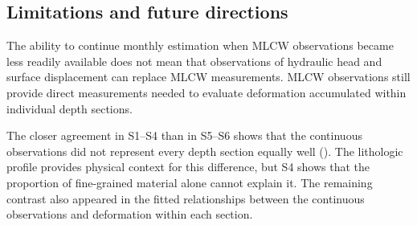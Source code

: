 \subsection{Limitations and future directions}
\label{subsec:discussion_limitations}

The ability to continue monthly estimation when MLCW observations became less readily available does not mean that observations of hydraulic head and surface displacement can replace MLCW measurements. MLCW observations still provide direct measurements needed to evaluate deformation accumulated within individual depth sections.

The closer agreement in S1--S4 than in S5--S6 shows that the continuous observations did not represent every depth section equally well (). The lithologic profile provides physical context for this difference, but S4 shows that the proportion of fine-grained material alone cannot explain it. The remaining contrast also appeared in the fitted relationships between the continuous observations and deformation within each section.

